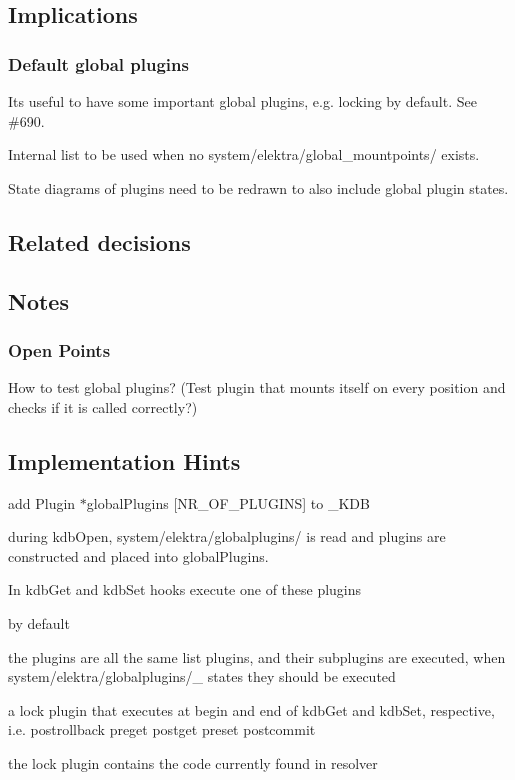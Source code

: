 \subsection*{Implications}

\subsubsection*{Default global plugins}

Its useful to have some important global plugins, e.\+g. locking by default. See \#690.

Internal list to be used when no system/elektra/global\+\_\+mountpoints/ exists.

State diagrams of plugins need to be redrawn to also include global plugin states.

\subsection*{Related decisions}

\subsection*{Notes}

\subsubsection*{Open Points}


\begin{DoxyItemize}
\item How to test global plugins? (Test plugin that mounts itself on every position and checks if it is called correctly?)
\end{DoxyItemize}

\subsection*{Implementation Hints}


\begin{DoxyItemize}
\item add {\ttfamily Plugin $\ast$global\+Plugins \mbox{[}N\+R\+\_\+\+O\+F\+\_\+\+P\+L\+U\+G\+I\+NS\mbox{]}} to {\ttfamily \+\_\+\+K\+DB}
\item during {\ttfamily kdb\+Open}, {\ttfamily system/elektra/globalplugins/} is read and plugins are constructed and placed into {\ttfamily global\+Plugins}.
\item In kdb\+Get and kdb\+Set hooks execute one of these plugins
\item by default
\begin{DoxyItemize}
\item the plugins are all the same {\ttfamily list} plugins, and their subplugins are executed, when {\ttfamily system/elektra/globalplugins/\+\_\+} states they should be executed
\item a {\ttfamily lock} plugin that executes at begin and end of kdb\+Get and kdb\+Set, respective, i.\+e. postrollback preget postget preset postcommit
\item the {\ttfamily lock} plugin contains the code currently found in resolver 
\end{DoxyItemize}
\end{DoxyItemize}